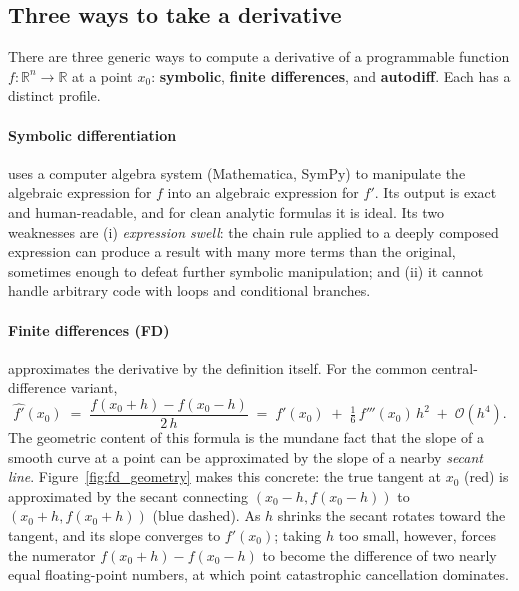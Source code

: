\documentclass[11pt,a4paper]{report}
\newcommand{\R}{\mathbb{R}}
\newcommand{\emphc}[1]{\textcolor{harvardcrimson}{\textbf{#1}}}
\begin{document}
\subsection{Three ways to take a derivative}
\label{sec:ad_three_methods}

There are three generic ways to compute a derivative of a programmable function $f:\R^n \to \R$ at a point $x_0$: \emphc{symbolic}, \emphc{finite differences}, and \emphc{autodiff}.  Each has a distinct profile.

\paragraph{Symbolic differentiation} uses a computer algebra system (Mathematica, SymPy) to manipulate the algebraic expression for $f$ into an algebraic expression for $f'$.  Its output is exact and human-readable, and for clean analytic formulas it is ideal.  Its two weaknesses are (i) \emph{expression swell}: the chain rule applied to a deeply composed expression can produce a result with many more terms than the original, sometimes enough to defeat further symbolic manipulation; and (ii) it cannot handle arbitrary code with loops and conditional branches.

\paragraph{Finite differences (FD)} approximates the derivative by the definition itself.  For the common central-difference variant,
\begin{equation}
\widehat{f'}(x_0) \;=\; \frac{f(x_0 + h) - f(x_0 - h)}{2\,h}
\;=\; f'(x_0) \;+\; \tfrac{1}{6}\,f'''(x_0)\,h^2 \;+\; \mathcal{O}(h^4).
\label{eq:fd_central}
\end{equation}
The geometric content of this formula is the mundane fact that the slope of a smooth curve at a point can be approximated by the slope of a nearby \emph{secant line}.  Figure~\ref{fig:fd_geometry} makes this concrete: the true tangent at $x_0$ (red) is approximated by the secant connecting $(x_0 - h, f(x_0-h))$ to $(x_0+h, f(x_0+h))$ (blue dashed).  As $h$ shrinks the secant rotates toward the tangent, and its slope converges to $f'(x_0)$; taking $h$ too small, however, forces the numerator $f(x_0+h) - f(x_0-h)$ to become the difference of two nearly equal floating-point numbers, at which point catastrophic cancellation dominates.
\end{document}
